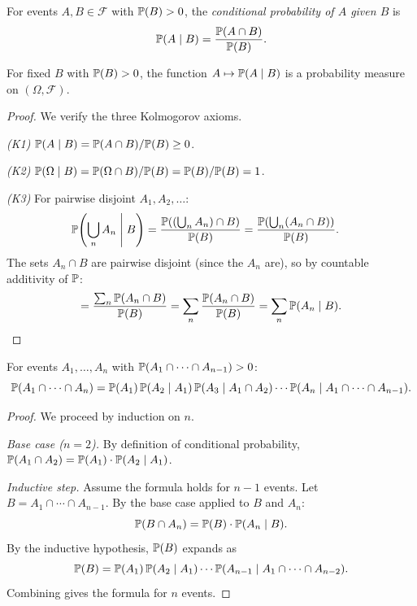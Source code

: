 \documentclass[11pt,a4paper]{article}
\begin{document}
\begin{definition}
\label{def:cond_prob}
For events $A, B \in \mathcal{F}$ with $\mathbb{P}(B) > 0$, the
\emph{conditional probability of $A$ given $B$} is
\begin{equation}
  \mathbb{P}(A \mid B) = \frac{\mathbb{P}(A \cap B)}{\mathbb{P}(B)}.
  \label{eq:cond_prob}
\end{equation}
\end{definition}

\begin{proposition}
\label{prop:cond_is_prob}
For fixed $B$ with $\mathbb{P}(B) > 0$, the function
$A \mapsto \mathbb{P}(A \mid B)$ is a probability measure on
$(\Omega, \mathcal{F})$.
\end{proposition}

\begin{proof}
We verify the three Kolmogorov axioms.

\textit{(K1)} $\mathbb{P}(A \mid B) = \mathbb{P}(A \cap B)/\mathbb{P}(B) \geq 0$.

\textit{(K2)} $\mathbb{P}(\Omega \mid B) = \mathbb{P}(\Omega \cap B)/\mathbb{P}(B)
= \mathbb{P}(B)/\mathbb{P}(B) = 1$.

\textit{(K3)} For pairwise disjoint $A_1, A_2, \ldots$:
\begin{align}
  \mathbb{P}\!\left(\bigcup_n A_n \;\middle|\; B\right)
  &= \frac{\mathbb{P}((\bigcup_n A_n) \cap B)}{\mathbb{P}(B)}
  = \frac{\mathbb{P}(\bigcup_n (A_n \cap B))}{\mathbb{P}(B)}.
\end{align}
The sets $A_n \cap B$ are pairwise disjoint (since the $A_n$ are), so by
countable additivity of $\mathbb{P}$:
\[
  = \frac{\sum_n \mathbb{P}(A_n \cap B)}{\mathbb{P}(B)}
  = \sum_n \frac{\mathbb{P}(A_n \cap B)}{\mathbb{P}(B)}
  = \sum_n \mathbb{P}(A_n \mid B). \qedhere
\]
\end{proof}

\begin{theorem}
\label{thm:chain_rule}
For events $A_1, \ldots, A_n$ with
$\mathbb{P}(A_1 \cap \cdots \cap A_{n-1}) > 0$:
\begin{equation}
  \mathbb{P}(A_1 \cap \cdots \cap A_n)
  = \mathbb{P}(A_1)\, \mathbb{P}(A_2 \mid A_1)\,
    \mathbb{P}(A_3 \mid A_1 \cap A_2)
    \cdots \mathbb{P}(A_n \mid A_1 \cap \cdots \cap A_{n-1}).
  \label{eq:chain_rule}
\end{equation}
\end{theorem}

\begin{proof}
We proceed by induction on $n$.

\textit{Base case ($n = 2$).} By definition of conditional probability,
$\mathbb{P}(A_1 \cap A_2) = \mathbb{P}(A_1) \cdot \mathbb{P}(A_2 \mid A_1)$.

\textit{Inductive step.} Assume the formula holds for $n - 1$ events.
Let $B = A_1 \cap \cdots \cap A_{n-1}$. By the base case applied to $B$
and $A_n$:
\[
  \mathbb{P}(B \cap A_n) = \mathbb{P}(B) \cdot \mathbb{P}(A_n \mid B).
\]
By the inductive hypothesis, $\mathbb{P}(B)$ expands as
\[
  \mathbb{P}(B) = \mathbb{P}(A_1)\, \mathbb{P}(A_2 \mid A_1) \cdots
  \mathbb{P}(A_{n-1} \mid A_1 \cap \cdots \cap A_{n-2}).
\]
Combining gives the formula for $n$ events.
\end{proof}
\end{document}
